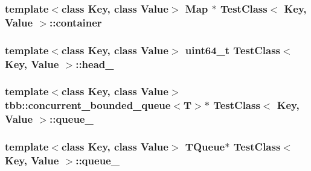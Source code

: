 \subsubsection[{container}]{\setlength{\rightskip}{0pt plus 5cm}template$<$class Key, class Value$>$ {\bf Map} $\ast$ {\bf Test\+Class}$<$ Key, {\bf Value} $>$\+::container\hspace{0.3cm}{\ttfamily [private]}}\label{class_test_class_a82e6fb0f71bfaeab7623660b1c6d5801}
\hypertarget{class_test_class_af57483e6863d4fbbe455be1a32514b92}{}
\subsubsection[{head\+\_\+}]{\setlength{\rightskip}{0pt plus 5cm}template$<$class Key, class Value$>$ uint64\+\_\+t {\bf Test\+Class}$<$ Key, {\bf Value} $>$\+::head\+\_\+\hspace{0.3cm}{\ttfamily [private]}}\label{class_test_class_af57483e6863d4fbbe455be1a32514b92}
\hypertarget{class_test_class_a165f4022d46081c8594106c0247cfef3}{}
\subsubsection[{queue\+\_\+}]{\setlength{\rightskip}{0pt plus 5cm}template$<$class Key, class Value$>$ tbb\+::concurrent\+\_\+bounded\+\_\+queue$<$T$>$$\ast$ {\bf Test\+Class}$<$ Key, {\bf Value} $>$\+::queue\+\_\+\hspace{0.3cm}{\ttfamily [private]}}\label{class_test_class_a165f4022d46081c8594106c0247cfef3}
\hypertarget{class_test_class_a6d2a5cb3e074be536e9637e3898a66c7}{}
\subsubsection[{queue\+\_\+}]{\setlength{\rightskip}{0pt plus 5cm}template$<$class Key, class Value$>$ {\bf T\+Queue}$\ast$ {\bf Test\+Class}$<$ Key, {\bf Value} $>$\+::queue\+\_\+\hspace{0.3cm}{\ttfamily [private]}}\label{class_test_class_a6d2a5cb3e074be536e9637e3898a66c7}
\hypertarget{class_test_class_a58c609d2496e3e96bf13fa26d9697c6c}{}
